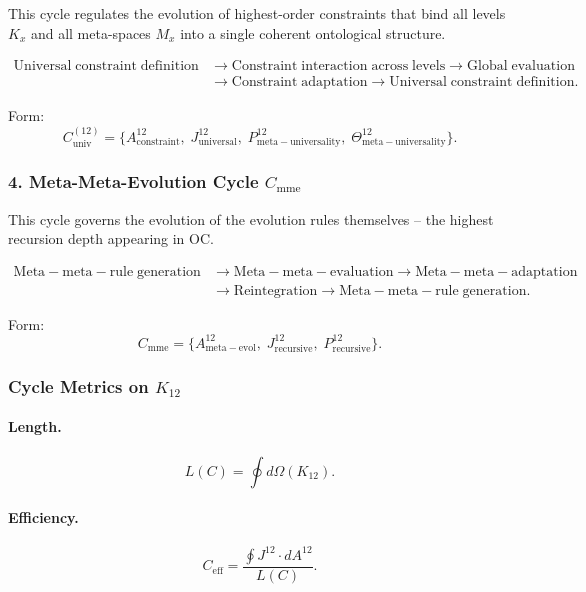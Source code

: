 This cycle regulates the evolution of highest-order constraints that bind all
levels $K_x$ and all meta-spaces $M_x$ into a single coherent ontological
structure.

\[
  \begin{aligned}
  \mathrm{Universal\;constraint\;definition}
  &\to \mathrm{Constraint\;interaction\;across\;levels}
  \to \mathrm{Global\;evaluation}\\
  &\to \mathrm{Constraint\;adaptation}
  \to \mathrm{Universal\;constraint\;definition}.
  \end{aligned}
\]

Form:
\[
  C_{\mathrm{univ}}^{(12)}
  =
  \{
    A^{12}_{\mathrm{constraint}},\;
    J^{12}_{\mathrm{universal}},\;
    P^{12}_{\mathrm{meta\!-\!universality}},\;
    \Theta^{12}_{\mathrm{meta\!-\!universality}}
  \}.
\]


\subsubsection{4. Meta-Meta-Evolution Cycle $C_{\mathrm{mme}}$}

This cycle governs the evolution of the evolution rules themselves --
the highest recursion depth appearing in OC.

\[
  \begin{aligned}
  \mathrm{Meta\!-\!meta\!-\!rule\;generation}
  &\to \mathrm{Meta\!-\!meta\!-\!evaluation}
  \to \mathrm{Meta\!-\!meta\!-\!adaptation}\\
  &\to \mathrm{Reintegration}
  \to \mathrm{Meta\!-\!meta\!-\!rule\;generation}.
  \end{aligned}
\]

Form:
\[
  C_{\mathrm{mme}}
  =
  \{
     A^{12}_{\mathrm{meta\!-\!evol}},\;
     J^{12}_{\mathrm{recursive}},\;
     P^{12}_{\mathrm{recursive}}
  \}.
\]


\subsubsection{Cycle Metrics on $K_{12}$}

\paragraph{Length.}
\[
  L(C)=\oint d\Omega(K_{12}).
\]

\paragraph{Efficiency.}
\[
  C_{\mathrm{eff}}
  = \frac{\oint J^{12}\cdot dA^{12}}{L(C)}.
\]

